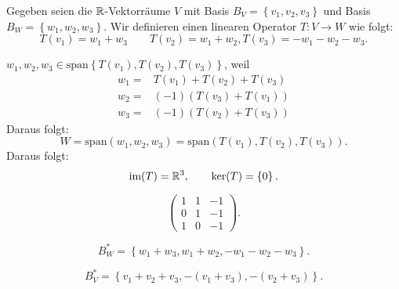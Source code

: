 \begin{Problem}
	Gegeben seien die $\mathbb{R}$-Vektorr\"{a}ume $V$ mit Basis $B_V=\left\{ v_1,v_2,v_3 \right\} $ und Basis $B_W=\left\{ w_1,w_2,w_3 \right\} $. Wir definieren einen linearen Operator $T: V \to W$ wie folgt:
	\[
	T(v_1)=w_1+w_3\qquad T(v_2)=w_1+w_2, T(v_3)=-w_1-w_2-w_3
	.\] 
	\begin{parts}
	\item $w_1,w_2,w_3\in \text{span}\left\{ T(v_1),T(v_2),T(v_3) \right\} $, weil
			\begin{align*}
				w_1=&T(v_1)+T(v_2)+T(v_3)\\
				w_2=&(-1)\left( T(v_3)+T(v_1) \right) \\
				w_3=&(-1)\left( T(v_2)+T(v_3) \right) 
			\end{align*}
			Daraus folgt:
			\[
				W=\text{span}\left( w_1,w_2,w_3 \right)=\text{span}\left( T(v_1), T(v_2), T(v_3) \right)  
			.\]
			Daraus folgt:
			\[
				\text{im}(T)=\mathbb{R}^3, \qquad \text{ker}(T)=\left\{ 0 \right\} 
			.\] 
		\item 
\[
	\begin{pmatrix} 1 & 1 & -1\\ 0 & 1 & -1\\1 & 0 & -1 \end{pmatrix} 
.\] 
\item \[
B_W^*=\left\{ w_1+w_3,w_1+w_2,-w_1-w_2-w_3 \right\} 
.\] 
\item \[
B_V^*=\left\{ v_1+v_2+v_3, -(v_1+v_3), -(v_2+v_3) \right\} 
.\] 
		\end{parts}
\end{Problem}
